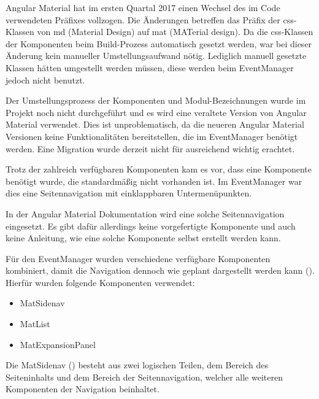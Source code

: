 


Angular Material hat im ersten Quartal 2017 einen Wechsel des im Code verwendeten Präfixes vollzogen.
Die Änderungen betreffen das Präfix der \gls{css}-Klassen von md (Material Design) auf mat (MATerial design).
Da die \gls{css}-Klassen der Komponenten beim Build-Prozess automatisch gesetzt werden, war bei dieser Änderung kein manueller Umstellungsaufwand nötig.
Lediglich manuell gesetzte Klassen hätten umgestellt werden müssen, diese werden beim EventManager jedoch nicht benutzt.

Der Umstellungsprozess der Komponenten und Modul-Bezeichnungen wurde im Projekt noch nicht durchgeführt und es wird eine veraltete Version von Angular Material verwendet. Dies ist unproblematisch, da die neueren Angular Material Versionen keine Funktionalitäten bereitstellen, die im EventManager benötigt werden. Eine Migration wurde derzeit nicht für ausreichend wichtig erachtet.

Trotz der zahlreich verfügbaren Komponenten kam es vor, dass eine Komponente benötigt wurde,
die standardmäßig nicht vorhanden ist. Im EventManager war dies eine Seitennavigation mit einklappbaren Untermenüpunkten.

In der Angular Material Dokumentation \cite{angularMaterial} wird eine solche Seitennavigation eingesetzt. Es gibt dafür allerdings keine vorgefertigte Komponente und auch keine Anleitung, wie eine solche Komponente selbst erstellt werden kann.


Für den EventManager wurden verschiedene verfügbare Komponenten kombiniert, damit die Navigation dennoch wie geplant dargestellt werden kann ().
Hierfür wurden folgende Komponenten verwendet:

\begin{itemize}
  \item MatSidenav
  \item MatList
  \item MatExpansionPanel
\end{itemize}

Die MatSidenav () besteht aus zwei logischen Teilen, dem Bereich des Seiteninhalts und dem Bereich der Seitennavigation, welcher alle weiteren Komponenten der Navigation beinhaltet.

